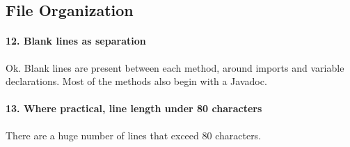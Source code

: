 \documentclass[english]{article}
\begin{document}
\subsection{File Organization}
\paragraph{12. Blank lines as separation}
Ok.
Blank lines are present between each method, around imports and variable declarations.
Most of the methods also begin with a Javadoc.

\paragraph{13. Where practical, line length under 80 characters}
There are a huge number of lines that exceed 80 characters.
\end{document}
